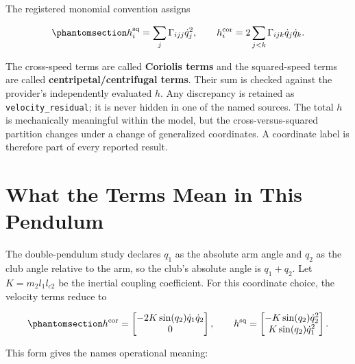 \documentclass[
  letterpaper,
]{report}
\begin{document}
The registered monomial convention assigns

\begin{equation}\phantomsection\label{eq-source-monomial-split}{
h_i^{\mathrm{sq}}=\sum_j\Gamma_{ijj}\dot q_j^2,
\qquad
h_i^{\mathrm{cor}}=2\sum_{j<k}\Gamma_{ijk}\dot q_j\dot q_k.
}\end{equation}

The cross-speed terms are called \textbf{Coriolis terms} and the
squared-speed terms are called \textbf{centripetal/centrifugal terms}.
Their sum is checked against the provider's independently evaluated
\(h\). Any discrepancy is retained as \texttt{velocity\_residual}; it is
never hidden in one of the named sources. The total \(h\) is
mechanically meaningful within the model, but the cross-versus-squared
partition changes under a change of generalized coordinates. A
coordinate label is therefore part of every reported result.

\section{What the Terms Mean in This
Pendulum}\label{sec-two-link-source-meaning}

The double-pendulum study declares \(q_1\) as the absolute arm angle and
\(q_2\) as the club angle relative to the arm, so the club's absolute
angle is \(q_1+q_2\). Let \(K=m_2 l_1 l_{c2}\) be the inertial coupling
coefficient. For this coordinate choice, the velocity terms reduce to

\begin{equation}\phantomsection\label{eq-two-link-source-terms}{
h^{\mathrm{cor}}
=
\begin{bmatrix}
-2K\sin(q_2)\dot q_1\dot q_2\\
0
\end{bmatrix},
\qquad
h^{\mathrm{sq}}
=
\begin{bmatrix}
-K\sin(q_2)\dot q_2^2\\
 K\sin(q_2)\dot q_1^2
\end{bmatrix}.
}\end{equation}

This form gives the names operational meaning:
\end{document}
